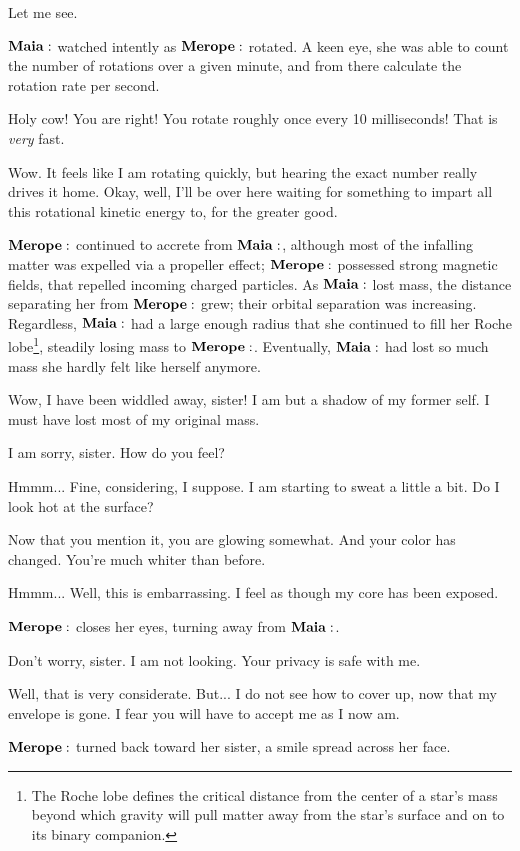 \Maia Let me see.

$\Maia$ watched intently as $\Merope$ rotated.  A keen eye, she was able to count the number of rotations over a given minute, and from there calculate the rotation rate per second.

\Maia Holy cow!  You are right! You rotate roughly once every 10 milliseconds!  That is \textit{very} fast.  

\Merope Wow.  It feels like I am rotating quickly, but hearing the exact number really drives it home.  Okay, well, I'll be over here waiting for something to impart all this rotational kinetic energy to, for the greater good. 

$\Merope$ continued to accrete from $\Maia$, although most of the infalling matter was expelled via a propeller effect; $\Merope$ possessed strong magnetic fields, that repelled incoming charged particles.  As $\Maia$ lost mass, the distance separating her from $\Merope$ grew; their orbital separation was increasing.  Regardless, $\Maia$ had a large enough radius that she continued to fill her Roche lobe\footnote{The Roche lobe defines the critical distance from the center of a star's mass beyond which gravity will pull matter away from the star's surface and on to its binary companion.}, steadily losing mass to $\Merope$.  Eventually, $\Maia$ had lost so much mass she hardly felt like herself anymore.

\Maia Wow, I have been widdled away, sister!  I am but a shadow of my former self.  I must have lost most of my original mass.  

\Merope I am sorry, sister.  How do you feel?

\Maia Hmmm... Fine, considering, I suppose.  I am starting to sweat a little a bit.  Do I look hot at the surface?

\Merope Now that you mention it, you are glowing somewhat.  And your color has changed. You're much whiter than before.

\Maia Hmmm...  Well, this is embarrassing.  I feel as though my core has been exposed.    

$\Merope$ closes her eyes, turning away from $\Maia$.

\Merope Don't worry, sister.  I am not looking.  Your privacy is safe with me.

\Maia Well, that is very considerate.  But... I do not see how to cover up, now that my envelope is gone. I fear you will have to accept me as I now am.

$\Merope$ turned back toward her sister, a smile spread across her face.

